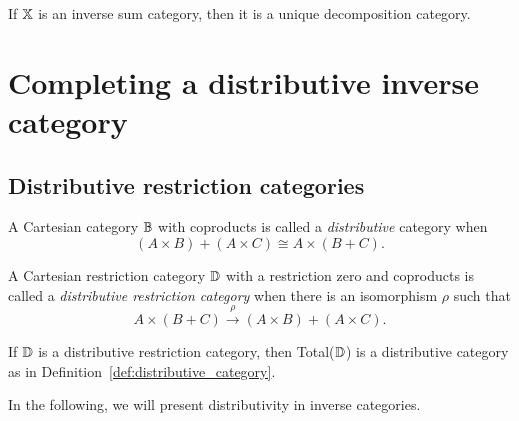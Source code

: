 \begin{corollary}\label{cor:inverse_sum_category_is_udc}
  If $\mathbb{X}$ is an inverse sum category, then it is a unique decomposition category.
\end{corollary}

\section{Completing a distributive inverse category} %
\label{sec:completing_a_distributive_inverse_category}
\subsection{Distributive restriction categories} %
\label{sub:distributive_restriction_categories}

\begin{definition}\label{def:distributive_category}
  A Cartesian category $\mathbb{B}$ with coproducts is called a
  \emph{distributive}\cite{cockett1993-introduction-distributive} category when
  \[
    (A\times B) + (A\times C) \cong A \times (B+ C).
  \]
\end{definition}

\begin{definition}\label{def:distributive_restriction_category}
  A Cartesian restriction category $\mathbb{D}$ with a restriction zero and coproducts is called a
  \emph{distributive restriction category}\cite{cockettlack2004:restcategories3}
  when there is an isomorphism $\rho$ such that
  \[
    A\times (B+C) \xrightarrow{\rho} (A\times B) +(A\times C).
  \]
\end{definition}

If $\mathbb{D}$ is a distributive restriction category, then Total($\mathbb{D}$) is a distributive
category as in Definition~\ref{def:distributive_category}.

In the following, we will present distributivity in inverse categories.


